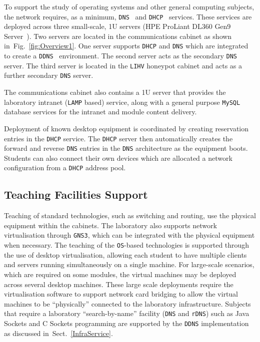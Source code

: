 \documentclass{llncs}
\begin{document}
To support the study of operating systems and other general computing subjects,
the network requires, as a minimum, \texttt{DNS}~\cite{RA:11} and
\texttt{DHCP}~\cite{DL:02} services. These services are deployed across three
small-scale, 1U servers (HPE ProLiant DL360 Gen9 Server~\cite{HPE:17}). Two
servers are located in the communications cabinet as shown
in~Fig.~\ref{fig:Overview1}. One server supports \texttt{DHCP} and \texttt{DNS}
which are integrated to create a \texttt{DDNS}~\cite{SV:06} environment. The
second server acts as the secondary \texttt{DNS} server. The third server is
located in the \texttt{LIHV} honeypot cabinet and acts as a further secondary
\texttt{DNS} server.

The communications cabinet also contains a 1U server that provides the
laboratory intranet (\texttt{LAMP} based) service, along with a general purpose
\texttt{MySQL} database services for the intranet and module content delivery.

Deployment of known desktop equipment is coordinated by creating reservation
entries in the \texttt{DHCP} service. The \texttt{DHCP} server then
automatically creates the forward and reverse \texttt{DNS} entries in the
\texttt{DNS} architecture as the equipment boots. Students can also connect
their own devices which are allocated a network configuration from a
\texttt{DHCP} address pool.

\subsection{Teaching Facilities Support}

Teaching of standard technologies, such as switching and routing, use the
physical equipment within the cabinets. The laboratory also supports network
virtualisation through \texttt{GNS3}, which can be integrated with the physical
equipment when necessary. The teaching of the \texttt{OS}-based technologies is
supported through the use of desktop virtualisation, allowing each student to
have multiple clients and servers running simultaneously on a single machine.
For large-scale scenarios, which are required on some modules, the virtual
machines may be deployed across several desktop machines. These large scale
deployments require the virtualisation software to support network card
bridging to allow the virtual machines to be ``physically'' connected to the
laboratory infrastructure.  Subjects that require a laboratory
``search-by-name'' facility (\texttt{DNS} and \texttt{rDNS}) such as Java
Sockets and C Sockets programming are supported by the \texttt{DDNS}
implementation as discussed in~Sect.~\ref{InfraService}.
\end{document}
